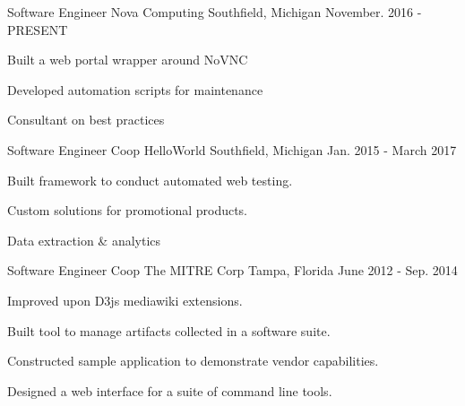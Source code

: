 

\begin{cventries}


  \cventry
    {Software Engineer} %
    {Nova Computing} %
    {Southfield, Michigan} %
    {November. 2016 - PRESENT} %
    {
      \begin{cvitems} %
        \item {Built a web portal wrapper around NoVNC}
        \item {Developed automation scripts for maintenance}
	\item {Consultant on best practices}
      \end{cvitems}
    }


  \cventry
    {Software Engineer Coop} %
    {HelloWorld} %
    {Southfield, Michigan} %
    {Jan. 2015 - March 2017} %
    {
      \begin{cvitems} %
        \item {Built framework to conduct automated web testing.}
        \item {Custom solutions for promotional products.}
        \item {Data extraction \& analytics}
      \end{cvitems}
    }

  \cventry
    {Software Engineer Coop} %
    {The MITRE Corp} %
    {Tampa, Florida} %
    {June 2012 - Sep. 2014} %
    {
      \begin{cvitems} %
        \item {Improved upon D3js mediawiki extensions.}
        \item {Built tool to manage artifacts collected in a software suite.}
        \item {Constructed sample application to demonstrate vendor capabilities.}
        \item {Designed a web interface for a suite of command line tools.}
      \end{cvitems}
    }

\end{cventries}
